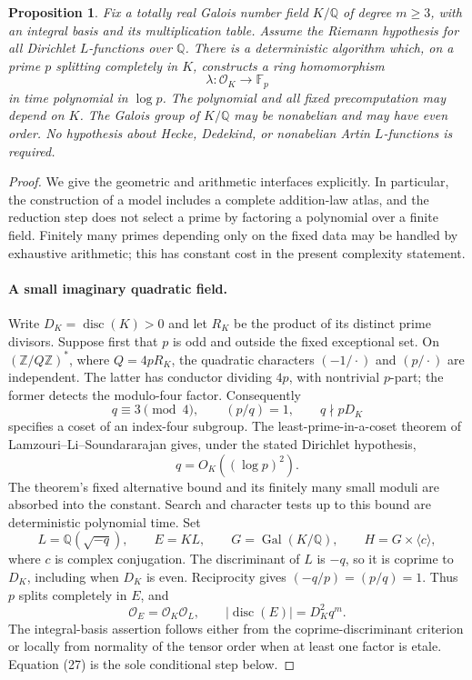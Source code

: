 \documentclass[11pt]{article}
\newtheorem{proposition}[theorem]{Proposition}
\theoremstyle{definition}
\theoremstyle{remark}
\begin{document}
\begin{proposition}\label{prop:fixed-real-residue}
Fix a totally real Galois number field $K/\mathbb Q$ of degree $m\geq3$,
with an integral basis and its multiplication table.  Assume the Riemann
hypothesis for all Dirichlet $L$-functions over $\mathbb Q$.  There is a
deterministic algorithm which, on a prime $p$ splitting completely in $K$,
constructs a ring homomorphism
\[
 \lambda:\mathcal O_K\longrightarrow\mathbb F_p
\]
in time polynomial in $\log p$.  The polynomial and all fixed precomputation
may depend on $K$.  The Galois group of $K/\mathbb Q$ may be nonabelian and
may have even order.  No hypothesis about Hecke, Dedekind, or nonabelian
Artin $L$-functions is required.
\end{proposition}

\begin{proof}
We give the geometric and arithmetic interfaces explicitly.  In particular,
the construction of a model includes a complete addition-law atlas, and the
reduction step does not select a prime by factoring a polynomial over a finite
field.  Finitely many primes depending only on the fixed data may be handled
by exhaustive arithmetic; this has constant cost in the present complexity
statement.

\paragraph{A small imaginary quadratic field.}
Write $D_K=\operatorname{disc}(K)>0$ and let $R_K$ be the product of its
distinct prime divisors.  Suppose first that $p$ is odd and outside the fixed
exceptional set.  On $(\mathbb Z/Q\mathbb Z)^*$, where $Q=4pR_K$, the
quadratic characters $(-1/\cdot)$ and $(p/\cdot)$ are independent.  The latter
has conductor dividing $4p$, with nontrivial $p$-part; the former detects the
modulo-four factor.  Consequently
\[
 q\equiv3\pmod4,\qquad (p/q)=1,\qquad q\nmid pD_K
\]
specifies a coset of an index-four subgroup.  The least-prime-in-a-coset
theorem of Lamzouri--Li--Soundararajan
\cite[Theorem 1.4, p.~3]{LLS2015} gives, under the stated Dirichlet hypothesis,
\[
 q=O_K((\log p)^2).
\]
The theorem's fixed alternative bound and its finitely many small moduli are
absorbed into the constant.  Search and character tests up to this bound are
deterministic polynomial time.  Set
\[
 L=\mathbb Q(\sqrt{-q}),\qquad E=KL,
 \qquad G=\operatorname{Gal}(K/\mathbb Q),
 \qquad H=G\times\langle c\rangle,
\]
where $c$ is complex conjugation.  The discriminant of $L$ is $-q$, so it is
coprime to $D_K$, including when $D_K$ is even.  Reciprocity gives
$(-q/p)=(p/q)=1$.  Thus $p$ splits completely in $E$, and
\[
 \mathcal O_E=\mathcal O_K\mathcal O_L,
 \qquad |\operatorname{disc}(E)|=D_K^2q^m.
\]
The integral-basis assertion follows either from the coprime-discriminant
criterion or locally from normality of the tensor order when at least one
factor is etale.  Equation (27) is the sole conditional step below.


\end{proof}
\end{document}
